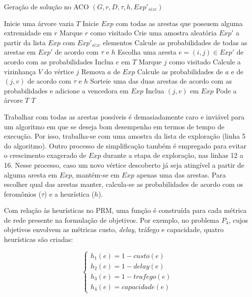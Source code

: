\begin{algorithm}
	\caption{Geração de solução no ACO $(G, r, D, \tau, h, Exp'_{size})$}
	\label{alg_aco_prm_construir_solucao}
	\begin{algorithmic}[1]
		\State Inicie uma árvore vazia $T$
		\State Inicie $Exp$ com todas as arestas que possuem alguma extremidade em $r$
		\State Marque $r$ como visitado
		\State Crie uma amostra aleatória $Exp'$ a partir da lista $Exp$ com $Exp'_{size}$ elementos
		\State Calcule as probabilidades de todas as arestas em $Exp'$ de acordo com $\tau$ e $h$
		\State Escolha uma aresta $e=(i,j) \in Exp'$ de acordo com as probabilidades
		\State Inclua $e$ em $T$
		\State Marque $j$ como visitado
		\State Calcule a vizinhança $V$ do vértice $j$
		\State Remova $a$ de $Exp$
		\State Calcule as probabilidades de $a$ e de $(j, v)$ de acordo com $\tau$ e $h$
		\State Sorteie uma das duas arestas de acordo com as probabilidades e adicione a vencedora em $Exp$
		\State Inclua $(j, v)$ em $Exp$
		\EndIf
		\EndFor
		\EndWhile
		\State Pode a árvore $T$
		\State \Return $T$
	\end{algorithmic}
\end{algorithm}

Trabalhar com todas as arestas possíveis é demasiadamente caro e inviável para um algoritmo em que se deseja bom desempenho em termos de tempo de execução. Por isso, trabalha-se com uma amostra da lista de exploração (linha 5 do algoritmo). Outro processo de simplificação também é empregado para evitar o crescimento exagerado de $Exp$ durante a etapa de exploração, nas linhas 12 a 16. Nesse processo, caso um novo vértice descoberto já seja atingível a partir de alguma aresta em $Exp$, mantém-se em $Exp$ apenas uma das arestas. Para escolher qual das arestas manter, calcula-se as probabilidades de acordo com os feromônios ($\tau$) e a heurística ($h$).

Com relação às heurísticas no PRM, uma função é construída para cada métrica de rede presente na formulação de objetivos. Por exemplo, no problema $P_4$, cujos objetivos envolvem as métricas custo, \textit{delay}, tráfego e capacidade, quatro heurísticas são criadas:

\[ \begin{cases} 
h_1(e) = 1 - custo(e) \\
h_2(e) = 1 - delay(e) \\
h_3(e) = 1 - trafego(e) \\
h_4(e) = capacidade(e)
\end{cases}
\]

